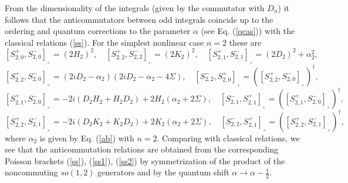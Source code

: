 \documentclass[a4paper,12pt]{article}
\begin{document}
{}From the dimensionality of the integrals
(given by the commutator with $D_n$)
it follows that the anticommutators between odd integrals
coincide up to the ordering and quantum corrections
to the parameter $\alpha$ (see Eq. (\ref{qcas}))
with the classical relations (\ref{ss}).
For the simplest nonlinear case $n=2$ these are
$$
[S^+_{2,0},S^-_{2,0}]_{{}_+}=(2H_2)^2,\quad
[S^+_{2,2},S^-_{2,2}]_{{}_+}=(2K_2)^2,\quad
[S^+_{2,1},S^-_{2,1}]_{{}_+}=(2D_2)^2+\alpha_2^2,
$$
$$
[S^+_{2,2},S^-_{2,0}]_{{}_+}=\left(2iD_2-\alpha_2
\right)
\left(2iD_2-\alpha_2-4\Sigma\right),\quad
[S^-_{2,2},S^+_{2,0}]_{{}_+}=([S^+_{2,2},S^-_{2,0}]_{{}_+})^
\dagger,
$$
$$
[S^+_{2,1},S^-_{2,0}]_{{}_+}=
-2i(D_2H_2+H_2D_2)+2H_2\left(\alpha_2+2\Sigma\right),
\quad
[S^-_{2,1},S^+_{2,1}]_{{}_+}=([S^+_{2,1},S^-_{2,0}]_{{}_+})^
\dagger,
$$
$$
[S^+_{2,2},S^-_{2,1}]_{{}_+}=
-2i(D_2K_2+K_2D_2)+2K_2\left(\alpha_2+2\Sigma\right),\quad
[S^-_{2,2},S^+_{2,1}]_{{}_+}=([S^+_{2,2},S^-_{2,1}]_{{}_+})^
\dagger,
$$
where $\alpha_2$ is given by Eq. (\ref{ab})
with $n=2$.
Comparing with classical relations, we see that
the anticommutation relations are obtained from the
corresponding
Poisson brackets (\ref{ss}), (\ref{ss1}), (\ref{ss2}) by
symmetrization of the product of the
noncommuting $so(1,2)$ generators
and by the quantum shift
$\alpha\rightarrow \alpha-\frac{1}{2}$.
\end{document}
